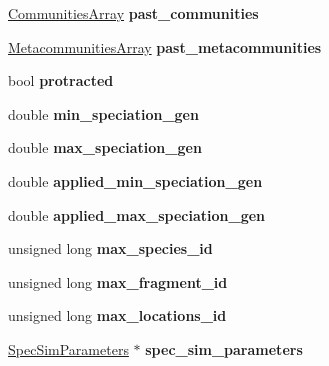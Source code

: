 \begin{DoxyCompactItemize}
\item 
\hyperlink{struct_communities_array}{Communities\+Array} {\bfseries past\+\_\+communities}\hypertarget{class_community_a0726a962287af565658aaa8f9d9ea6c1}{}\label{class_community_a0726a962287af565658aaa8f9d9ea6c1}

\item 
\hyperlink{struct_metacommunities_array}{Metacommunities\+Array} {\bfseries past\+\_\+metacommunities}\hypertarget{class_community_ae00d8d9f52d163b040cc716955569ad3}{}\label{class_community_ae00d8d9f52d163b040cc716955569ad3}

\item 
bool {\bfseries protracted}\hypertarget{class_community_acab5a676e365934f9dfd2148ab9d5a60}{}\label{class_community_acab5a676e365934f9dfd2148ab9d5a60}

\item 
double {\bfseries min\+\_\+speciation\+\_\+gen}\hypertarget{class_community_a6b906ec2096b22631b60aa3511925fe0}{}\label{class_community_a6b906ec2096b22631b60aa3511925fe0}

\item 
double {\bfseries max\+\_\+speciation\+\_\+gen}\hypertarget{class_community_aeff6623b51fdd177e87b6eebfba27080}{}\label{class_community_aeff6623b51fdd177e87b6eebfba27080}

\item 
double {\bfseries applied\+\_\+min\+\_\+speciation\+\_\+gen}\hypertarget{class_community_aa5e9946a354a46d675e015d803cc7fa1}{}\label{class_community_aa5e9946a354a46d675e015d803cc7fa1}

\item 
double {\bfseries applied\+\_\+max\+\_\+speciation\+\_\+gen}\hypertarget{class_community_a77d20815b5638387ce186130657ec660}{}\label{class_community_a77d20815b5638387ce186130657ec660}

\item 
unsigned long {\bfseries max\+\_\+species\+\_\+id}\hypertarget{class_community_a31f80e452a92aabdf2d9ba7bcc798f84}{}\label{class_community_a31f80e452a92aabdf2d9ba7bcc798f84}

\item 
unsigned long {\bfseries max\+\_\+fragment\+\_\+id}\hypertarget{class_community_a5de3afc536570241b82489d1b9c87d03}{}\label{class_community_a5de3afc536570241b82489d1b9c87d03}

\item 
unsigned long {\bfseries max\+\_\+locations\+\_\+id}\hypertarget{class_community_ae503af91bc33ed302a363098a3b49a61}{}\label{class_community_ae503af91bc33ed302a363098a3b49a61}

\item 
\hyperlink{struct_spec_sim_parameters}{Spec\+Sim\+Parameters} $\ast$ {\bfseries spec\+\_\+sim\+\_\+parameters}\hypertarget{class_community_a45df8aefb9914e7c8f3133143069ca35}{}\label{class_community_a45df8aefb9914e7c8f3133143069ca35}

\end{DoxyCompactItemize}


